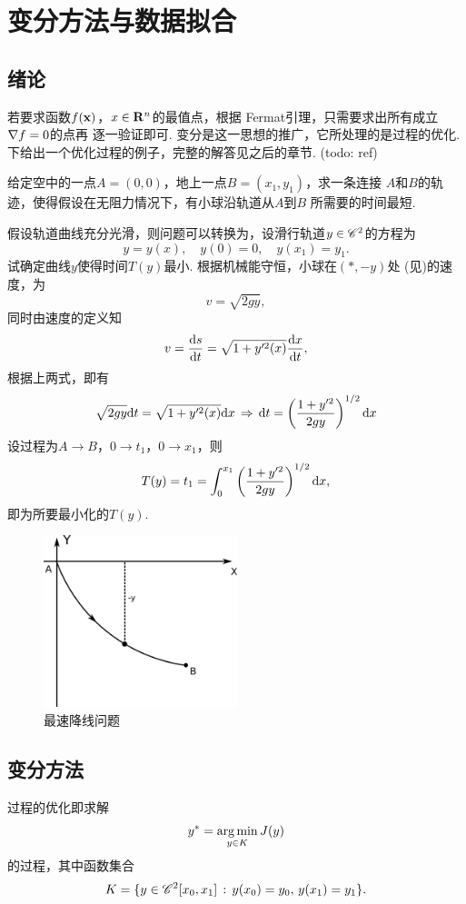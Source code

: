 \section{变分方法与数据拟合}
\subsection{绪论}
  若要求函数$\mathnormal{f}(\mathbf{x})$，$x\in\mathbf{R}^n$的最值点，根据
  Fermat引理，只需要求出所有成立$\nabla\mathnormal{f} = 0$的点再
  逐一验证即可. 变分是这一思想的推广，它所处理的是过程的优化.
  下给出一个优化过程的例子，完整的解答见之后的章节. (todo: ref)

  \begin{exa}[最速降线]
    给定空中的一点$A=(0,0)$，地上一点$B=(x_1,y_1)$，求一条连接
    $A$和$B$的轨迹，使得假设在无阻力情况下，有小球沿轨道从$A$到$B$
    所需要的时间最短. \par
    假设轨道曲线充分光滑，则问题可以转换为，设滑行轨道$y\in\mathscr{C}^2$的方程为
    \[
      y=y(x), \quad y(0)=0,\quad y(x_1) = y_1.
    \]
    试确定曲线$y$使得时间$T(y)$最小. 根据机械能守恒，小球在$(*,-y)$处
    (见)的速度，为
    \[
      v = \sqrt{2gy},
    \]
    同时由速度的定义知
    \[
      v = \frac{\mathrm{d} s}{\mathrm{d} t} = \sqrt{1+y^{\prime2}(x)}\frac{\mathrm{d} x}{\mathrm{d} t},
    \]
    根据上两式，即有
    \[
      \sqrt{2gy}\mathrm{d} t = \sqrt{1+y^{\prime2}(x)}\mathrm{d} x \,\Rightarrow\,
      \mathrm{d} t = \left( \frac{1+y^{\prime2}}{2gy} \right)^{1/2}\mathrm{d} x
    \]
    设过程为$A\to B$，$0\to t_1$，$0\to x_1$，则
    \[
      T(y) = t_1 = \int_0^{x_1} \left( \frac{1+y^{\prime2}}{2gy} \right)^{1/2}\mathrm{d} x,
    \]
    即为所要最小化的$T(y)$.
    \begin{figure}[htbp]
      \centering
      \includegraphics[height=5cm]{../image/brachistochrone.png}
      \caption{最速降线问题}
      \label{fig: 最速降线问题}
    \end{figure}
  \end{exa}

\newpage
\subsection{变分方法}
  \begin{defi}[过程优化]
    \label{def: 过程优化}
    过程的优化即求解
    \[
      \label{equ: 过程优化}
      y^* = \operatorname*{arg\,min}_{y\in K}J(y)
    \]
    的过程，其中函数集合
    \[
      K = \{y\in\mathscr{C}^2[x_0, x_1]\,:\, y(x_0)=y_0,\,y(x_1)=y_1\}.
    \]
  \end{defi}

